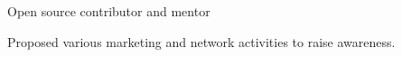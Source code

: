 

\begin{cventries}

  \cventry
    {Open source contributor and mentor} %
    {
      \begin{cvitems} %
        \item {Proposed various marketing and network activities to raise awareness.}
      \end{cvitems}
    }
\end{cventries}
